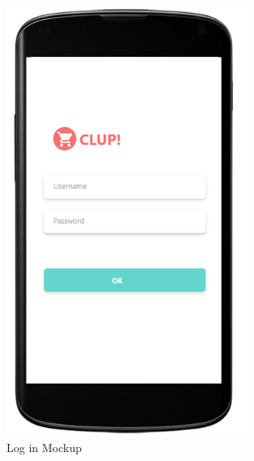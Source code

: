 \begin{figure}[H]
  \centering
  \includegraphics[width=0.7\textwidth,keepaspectratio]{images/6.png}
  \caption{Log in Mockup}
\end{figure}

